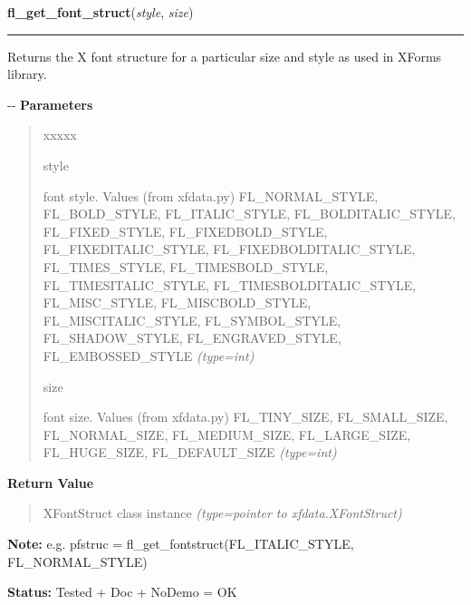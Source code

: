     \label{xformslib:flxbasic:fl_get_fontstruct}

    \vspace{0.5ex}

\hspace{.8\funcindent}\begin{boxedminipage}{\funcwidth}

    \raggedright \textbf{fl\_get\_font\_struct}(\textit{style}, \textit{size})

    \vspace{-1.5ex}

    \rule{\textwidth}{0.5\fboxrule}
\setlength{\parskip}{2ex}

Returns the X font structure for a particular size and style as used
in XForms library.

-{}-
\setlength{\parskip}{1ex}
      \textbf{Parameters}
      \vspace{-1ex}

      \begin{quote}
        \begin{Ventry}{xxxxx}

          \item[style]


font style. Values (from xfdata.py) FL\_NORMAL\_STYLE, FL\_BOLD\_STYLE,
FL\_ITALIC\_STYLE, FL\_BOLDITALIC\_STYLE, FL\_FIXED\_STYLE,
FL\_FIXEDBOLD\_STYLE, FL\_FIXEDITALIC\_STYLE, FL\_FIXEDBOLDITALIC\_STYLE,
FL\_TIMES\_STYLE, FL\_TIMESBOLD\_STYLE, FL\_TIMESITALIC\_STYLE,
FL\_TIMESBOLDITALIC\_STYLE, FL\_MISC\_STYLE, FL\_MISCBOLD\_STYLE,
FL\_MISCITALIC\_STYLE, FL\_SYMBOL\_STYLE, FL\_SHADOW\_STYLE,
FL\_ENGRAVED\_STYLE, FL\_EMBOSSED\_STYLE
            {\it (type=int)}

          \item[size]


font size. Values (from xfdata.py) FL\_TINY\_SIZE, FL\_SMALL\_SIZE,
FL\_NORMAL\_SIZE, FL\_MEDIUM\_SIZE, FL\_LARGE\_SIZE, FL\_HUGE\_SIZE,
FL\_DEFAULT\_SIZE
            {\it (type=int)}

        \end{Ventry}

      \end{quote}

      \textbf{Return Value}
    \vspace{-1ex}

      \begin{quote}

XFontStruct class instance
      {\it (type=pointer to xfdata.XFontStruct)}

      \end{quote}

\textbf{Note:} 
e.g. pfstruc = fl\_get\_fontstruct(FL\_ITALIC\_STYLE, FL\_NORMAL\_STYLE)


\textbf{Status:} 
Tested + Doc + NoDemo = OK


    \end{boxedminipage}

